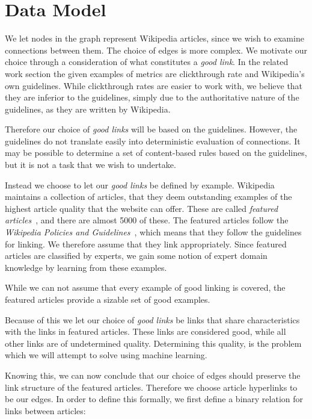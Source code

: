 \section{Data Model}\label{sec:choice_of_graph}

We let nodes in the graph represent Wikipedia articles, since we wish to examine connections between them. The choice of edges is more complex. We motivate our choice through a consideration of what constitutes a \emph{good link}. In the related work section the given examples of metrics are clickthrough rate and Wikipedia's own guidelines. While clickthrough rates are easier to work with, we believe that they are inferior to the guidelines, simply due to the authoritative nature of the guidelines, as they are written by Wikipedia. 

Therefore our choice of \emph{good links} will be based on the guidelines. However, the guidelines do not translate easily into deterministic evaluation of connections. It may be possible to determine a set of content-based rules based on the guidelines, but it is not a task that we wish to undertake.

Instead we choose to let our \emph{good links} be defined by example. Wikipedia maintains a collection of articles, that they deem outstanding examples of the highest article quality that the website can offer. These are called \emph{featured articles}~\cite{wiki-featured-articles}, and there are almost 5000 of these. The featured articles follow the \emph{Wikipedia Policies and Guidelines}~\cite{wiki-editor-guidelines}, which means that they follow the guidelines for linking. We therefore assume that they link appropriately. Since featured articles are classified by experts, we gain some notion of expert domain knowledge by learning from these examples.

While we can not assume that every example of good linking is covered, the featured articles provide a sizable set of good examples.

Because of this we let our choice of \emph{good links} be links that share characteristics with the links in featured articles. These links are considered good, while all other links are of undetermined quality. Determining this quality, is the problem which we will attempt to solve using machine learning.

Knowing this, we can now conclude that our choice of edges should preserve the link structure of the featured articles. Therefore we choose article hyperlinks to be our edges. In order to define this formally, we first define a binary relation for links between articles:

